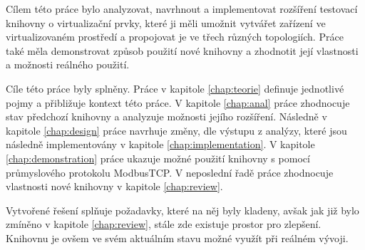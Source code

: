 \begin{conclusion}
Cílem této práce bylo analyzovat, navrhnout a implementovat rozšíření testovací knihovny o virtualizační prvky, které ji měli umožnit vytvářet zařízení ve virtualizovaném prostředí a propojovat je ve třech různých topologiích. Práce také měla demonstrovat způsob použití nové knihovny a zhodnotit její vlastnosti a možnosti reálného použití.

Cíle této práce byly splněny. Práce v kapitole \ref{chap:teorie} definuje jednotlivé pojmy a přibližuje kontext této práce. V kapitole \ref{chap:anal} práce zhodnocuje stav předchozí knihovny a analyzuje možnosti jejího rozšíření. Následně v kapitole \ref{chap:design} práce navrhuje změny, dle výstupu z analýzy, které jsou následně implementovány v kapitole \ref{chap:implementation}. V kapitole \ref{chap:demonstration} práce ukazuje možné použití knihovny s pomocí průmyslového protokolu ModbusTCP. V neposlední řadě práce zhodnocuje vlastnosti nové knihovny v kapitole \ref{chap:review}.

Vytvořené řešení splňuje požadavky, které na něj byly kladeny, avšak jak již bylo zmíněno v kapitole \ref{chap:review}, stále zde existuje prostor pro zlepšení. Knihovnu je ovšem ve svém aktuálním stavu možné využít při reálném vývoji. 
\end{conclusion}